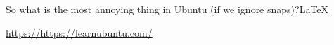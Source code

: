 \documentclass{article}
\begin{document}
So what is the most annoying thing in Ubuntu (if we ignore snaps)?\LaTeX

\url{https://https://learnubuntu.com/}
\end{document}
